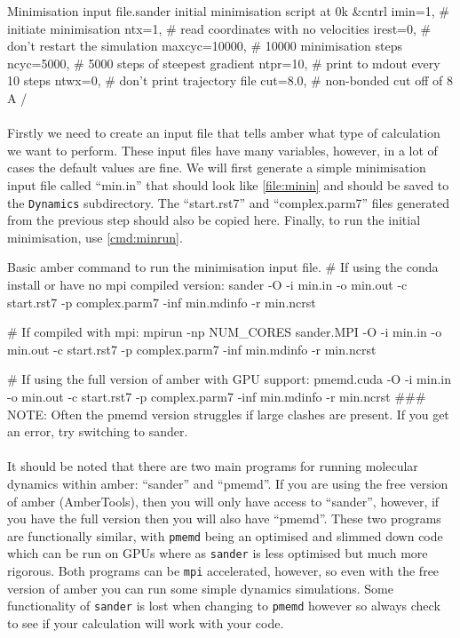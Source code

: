 \begin{inpfile}[label=file:minin]{Minimisation input file.}{sander}
initial minimisation script at 0k
&cntrl
  imin=1,       # initiate minimisation
  ntx=1,        # read coordinates with no velocities
  irest=0,      # don't restart the simulation
  maxcyc=10000, # 10000 minimisation steps
  ncyc=5000,    # 5000 steps of steepest gradient
  ntpr=10,      # print to mdout every 10 steps
  ntwx=0,       # don't print trajectory file
  cut=8.0,      # non-bonded cut off of 8 A
/

\end{inpfile}

    \paragraph{}
        Firstly we need to create an input file that tells amber what type of calculation we want to perform. These input files have many variables, however, in a lot of cases the default values are fine. We will first generate a simple minimisation input file called \enquote{min.in} that should look like \cref{file:minin} and should be saved to the \texttt{Dynamics} subdirectory. The \enquote{start.rst7} and \enquote{complex.parm7} files generated from the previous step should also be copied here. Finally, to run the initial minimisation, use \cref{cmd:minrun}.
        
\begin{bashcmd}[label=cmd:minrun]{Basic amber command to run the minimisation input file.}
# If using the conda install or have no mpi compiled version:
sander -O -i min.in -o min.out -c start.rst7 -p complex.parm7 -inf min.mdinfo -r min.ncrst

# If compiled with mpi:
mpirun -np NUM_CORES sander.MPI -O -i min.in -o min.out -c start.rst7 -p complex.parm7 -inf min.mdinfo -r min.ncrst

# If using the full version of amber with GPU support:
pmemd.cuda -O -i min.in -o min.out -c start.rst7 -p complex.parm7 -inf min.mdinfo -r min.ncrst
### NOTE: Often the pmemd version struggles if large clashes are present. If you get an error, try switching to sander.
\end{bashcmd}

    \paragraph{}
        It should be noted that there are two main programs for running molecular dynamics within amber: \enquote{sander} and \enquote{pmemd}. If you are using the free version of amber (AmberTools), then you will only have access to  \enquote{sander}, however, if you have the full version then you will also have \enquote{pmemd}. These two programs are functionally similar, with \texttt{pmemd} being an optimised and slimmed down code which can be run on GPUs where as \texttt{sander} is less optimised but much more rigorous. Both programs can be \texttt{mpi} accelerated, however, so even with the free version of amber you can run some simple dynamics simulations. Some functionality of \texttt{sander} is lost when changing to \texttt{pmemd} however so always check to see if your calculation will work with your code.

